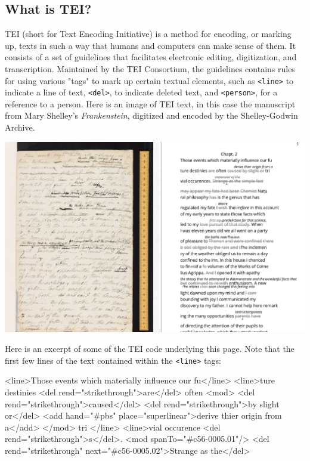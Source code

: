 \documentclass[11pt]{article}
\begin{document}
\subsection{What is TEI?}
\label{sec:orgecd8aa8}
TEI (short for Text Encoding Initiative) is a method for encoding, or
marking up, texts in such a way that humans and computers can make
sense of them. It consists of a set of guidelines that facilitates
electronic editing, digitization, and transcription. Maintained by the
TEI Consortium, the guidelines contains rules for using various "tags"
to mark up certain textual elements, such as \texttt{<line>} to indicate a
line of text, \texttt{<del>}, to indicate deleted text, and \texttt{<person>}, for a
reference to a person. Here is an image of TEI text, in this case the
manuscript from Mary Shelley's \emph{Frankenstein}, digitized and encoded
by the Shelley-Godwin Archive.

\begin{center}
\includegraphics[width=.9\linewidth]{./sga_diplo.png}
\end{center}

Here is an excerpt of some of the TEI code underlying this page. Note
that the first few lines of the text contained within the \texttt{<line>}
tags:

\begin{SOURCE}
<line>Those events which materially influence our fu</line>
<line>ture destinies 
<del rend="strikethrough">are</del> often 
<mod>
    <del rend="strikethrough">caused</del>
    <del rend="strikethrough">by slight or</del>
    <add hand="\#pbs" place="superlinear">derive thier origin from
    a</add>
  </mod> tri
</line>
<line>vial occurence
<del rend="strikethrough">s</del>. 
<mod spanTo="\#c56-0005.01"/>
<del rend="strikethrough" next="\#c56-0005.02">Strange as the</del>
\end{SOURCE}
\end{document}
